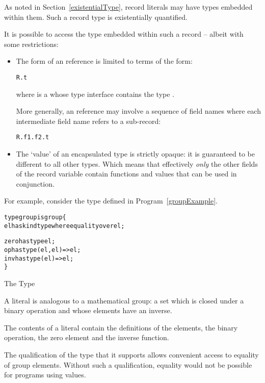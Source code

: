 As noted in Section~\vref{existentialType}, record literals may have types embedded within them. Such a record type is existentially quantified.

It is possible to access the type embedded within such a record -- albeit with some restrictions:
\begin{itemize}
\item The form of an  reference is limited to terms of the form:
\begin{alltt}
R.t
\end{alltt}
where  is a  whose type interface contains the type .

More generally, an  reference may involve a sequence of field names where each intermediate field name refers to a sub-record:
\begin{alltt}
R.f1.f2.t
\end{alltt}
\item The `value' of an encapsulated type is strictly opaque: it is guaranteed to be different to all other types. Which means that effectively \emph{only} the other fields of the record variable  contain functions and values that can be used in conjunction.
\end{itemize}

For example, consider the  type defined in Program~\vref{groupExample}.

\begin{program}
\begin{alltt}
type group is group\{
  el has kind type where equality over el;
  
  zero has type el;
  op has type (el,el)=>el;
  inv has type (el)=>el;
\}
\end{alltt}
\caption{The  Type}
\label{groupExample}
\end{program}

\begin{aside}
A  literal is analogous to a mathematical group: a set which is closed under a binary operation and whose elements have an inverse.

The contents of a  literal contain the definitions of the elements, the binary operation, the zero element and the inverse function.
\end{aside}
\begin{aside}
The qualification of the  type that it supports  allows convenient access to equality of group elements. Without such a qualification, equality would not be possible for programs using  values.
\end{aside}

